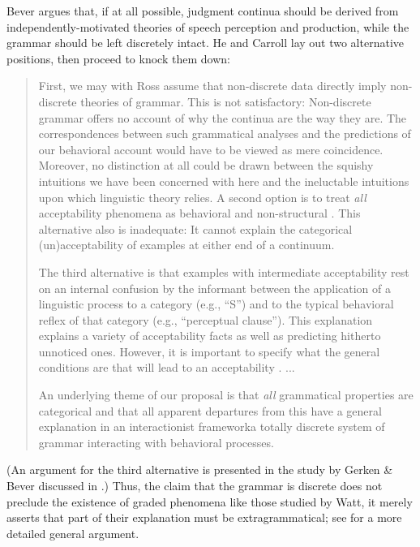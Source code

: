 \noindent
Bever argues that, if at all possible, judgment continua should be derived from independently-motivated theories of speech perception and production, while the grammar should be left discretely intact. He and Carroll lay out two alternative positions, then proceed to knock them down:

\begin{quote}
First, we may with Ross assume that non-discrete data directly imply non-discrete theories of grammar. This is not satisfactory: Non-discrete grammar offers no account of why the continua are the way they are. The correspondences between such grammatical analyses and the predictions of our behavioral account would have to be viewed as mere coincidence. Moreover, no distinction at all could be drawn between the squishy intuitions we have been concerned with here and the ineluctable intuitions upon which linguistic theory relies. A second option is to treat \textit{all} acceptability phenomena as behavioral and non-structural \citep{ClarkEtAl1974}. This alternative also is inadequate: It cannot explain the categorical (un)accepta\-bility of examples at either end of a continuum.



The third alternative is that examples with intermediate acceptability rest on an internal confusion by the informant between the application of a linguistic process to a category (e.g., ``S'') and to the typical behavioral reflex of that category (e.g., ``perceptual clause''). This explanation explains a variety of acceptability facts as well as predicting hitherto unnoticed ones. However, it is important to specify what the general conditions are that will lead to an acceptability . ...

An underlying theme of our proposal is that \textit{all} grammatical properties are categorical and that all apparent departures from this have a general explanation in an interactionist framework\schdash{}a totally discrete system of grammar interacting with behavioral processes.  \citep[232--233]{BeverEtAl1981}
\end{quote}


\noindent
(An argument for the third alternative is presented in the study by Gerken \& Bever discussed in .) Thus, the claim that the grammar is discrete does not preclude the existence of graded phenomena like those studied by Watt, it merely asserts that part of their explanation must be extragrammatical; see \citet{KatzEtAl1976} for a more detailed general argument.

